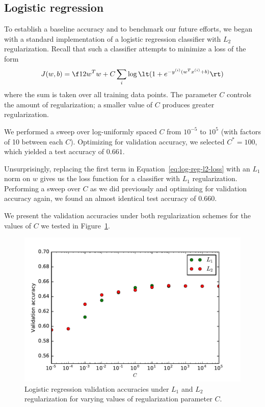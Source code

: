 \documentclass{article}
\newcommand{\sind}[1]{^{(#1)}}
\begin{document}
\begin{multicols}{2}
\section{Logistic regression}
\label{sec:logreg}

To establish a baseline accuracy
and to benchmark our future efforts,
we began with a standard implementation
of a logistic regression classifier
with $L_2$ regularization.
Recall that such a classifier attempts to minimize a loss of the form
\begin{equation}
    \label{eq:log-reg-l2-loss}
    J(w, b) = \f12 w^T w + C \sum_i \log\lt(1 + e^{-y\sind{i}(w^T x\sind{i} + b)}\rt)
\end{equation}
where the sum is taken over all training data points.
The parameter $C$ controls the amount of regularization;
a smaller value of $C$ produces greater regularization.

We performed a sweep over log-uniformly spaced $C$
from $10^{-5}$ to $10^5$ (with factors of 10 between each $C$).
Optimizing for validation accuracy,
we selected $C^* = 100$,
which yielded a test accuracy of $0.661$.

Unsurprisingly,
replacing the first term in Equation~\ref{eq:log-reg-l2-loss}
with an $L_1$ norm on $w$
gives us the loss function for a classifier with $L_1$ regularization.
Performing a sweep over $C$ as we did previously
and optimizing for validation accuracy again,
we found an almost identical test accuracy of $0.660$.

We present the validation accuracies
under both regularization schemes
for the values of $C$ we tested
in Figure~\ref{fig:log-reg-c-sweep}.

\begin{figure}[t] %
   \centering
   \includegraphics[width=4.5in]{img/log-reg-C-sweep.pdf}
   \caption{Logistic regression validation accuracies
   under $L_1$ and $L_2$ regularization
   for varying values of regularization parameter $C$.}
   \label{fig:log-reg-c-sweep}
\end{figure}



\end{multicols}
\end{document}
